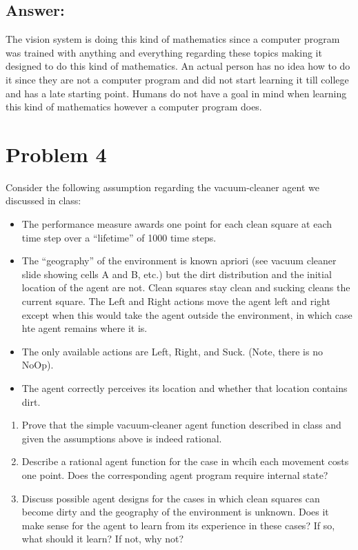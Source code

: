 \documentclass{article}
\begin{document}
\subsection*{Answer:}
The vision system is doing this kind of mathematics since a computer program was trained with anything and everything regarding these topics making it designed to do this kind of mathematics. An actual person has no idea how to do it since they are not a computer program and did not start learning it till college and has a late starting point. Humans do not have a goal in mind when learning this kind of mathematics however a computer program does.

\section*{Problem 4}
Consider the following assumption regarding the vacuum-cleaner agent we discussed in class:

\begin{itemize}
    \item The performance measure awards one point for each clean square at each time step over a “lifetime” of 1000 time steps.
    \item The “geography” of the environment is known apriori (see vacuum cleaner slide showing cells A and B, etc.) but the dirt distribution and the initial location of the agent are not. Clean squares stay clean and sucking cleans the current square. The Left and Right actions move the agent left and right except when this would take the agent outside the environment, in which case hte agent remains where it is.
    \item The only available actions are Left, Right, and Suck. (Note, there is no NoOp).
    \item The agent correctly perceives its location and whether that location contains dirt.
\end{itemize}

\begin{enumerate}[label= (\alph*)]
    \item Prove that the simple vacuum-cleaner agent function described in class and given the assumptions above is indeed rational. 
    \item Describe a rational agent function for the case in whcih each movement costs one point. Does the corresponding agent program require internal state?
    \item Discuss possible agent designs for the cases in which clean squares can become dirty and the geography of the environment is unknown. Does it make sense for the agent to learn from its experience in these cases? If so, what should it learn? If not, why not?
\end{enumerate}
\end{document}
